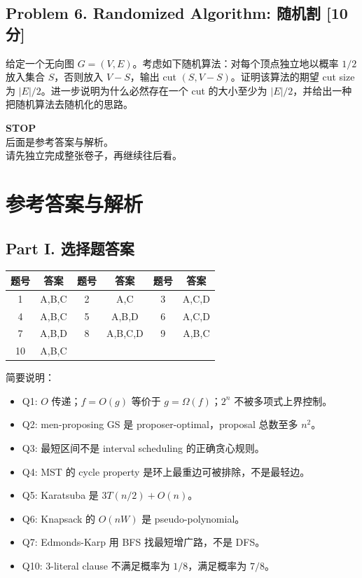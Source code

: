 \documentclass[UTF8,a4paper,11pt]{ctexart}
\newcommand{\points}[1]{\hfill{\small\textbf{[#1 分]}}}
\begin{document}
\subsection*{Problem 6. Randomized Algorithm: 随机割 \points{10}}

给定一个无向图 $G=(V,E)$。考虑如下随机算法：对每个顶点独立地以概率 $1/2$ 放入集合 $S$，否则放入 $V-S$，输出 cut $(S,V-S)$。证明该算法的期望 cut size 为 $|E|/2$。进一步说明为什么必然存在一个 cut 的大小至少为 $|E|/2$，并给出一种把随机算法去随机化的思路。

\newpage
\thispagestyle{empty}
\begin{center}
{\Huge \textbf{STOP}}\\[2em]
{\Large 后面是参考答案与解析。}\\[1em]
{\Large 请先独立完成整张卷子，再继续往后看。}
\end{center}

\newpage
\section*{参考答案与解析}

\subsection*{Part I. 选择题答案}

\begin{center}
\begin{tabular}{c|c@{\qquad}c|c@{\qquad}c|c}
\toprule
题号 & 答案 & 题号 & 答案 & 题号 & 答案\\
\midrule
1 & A,B,C & 2 & A,C & 3 & A,C,D\\
4 & A,B,C & 5 & A,B,D & 6 & A,C,D\\
7 & A,B,D & 8 & A,B,C,D & 9 & A,B,C\\
10 & A,B,C & & &\\
\bottomrule
\end{tabular}
\end{center}

简要说明：
\begin{itemize}
  \item Q1: $O$ 传递；$f=O(g)$ 等价于 $g=\Omega(f)$；$2^n$ 不被多项式上界控制。
  \item Q2: men-proposing GS 是 proposer-optimal，proposal 总数至多 $n^2$。
  \item Q3: 最短区间不是 interval scheduling 的正确贪心规则。
  \item Q4: MST 的 cycle property 是环上最重边可被排除，不是最轻边。
  \item Q5: Karatsuba 是 $3T(n/2)+O(n)$。
  \item Q6: Knapsack 的 $O(nW)$ 是 pseudo-polynomial。
  \item Q7: Edmonds-Karp 用 BFS 找最短增广路，不是 DFS。
  \item Q10: 3-literal clause 不满足概率为 $1/8$，满足概率为 $7/8$。
\end{itemize}
\end{document}
